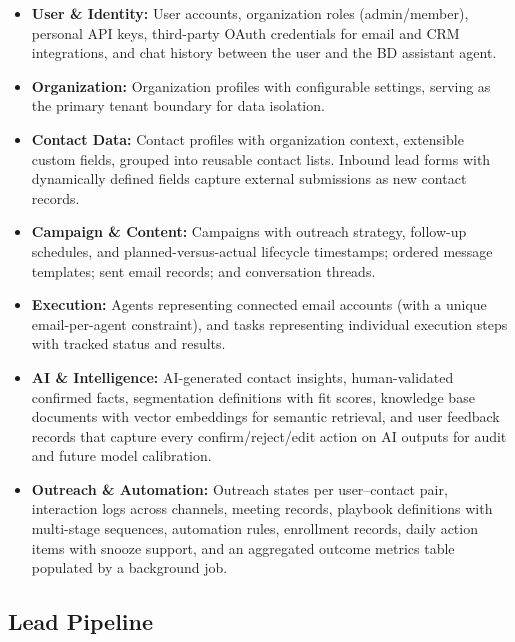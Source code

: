 \documentclass[a4paper]{article}
\begin{document}
\begin{itemize}
    \item \textbf{User \& Identity:} User accounts, organization
    roles (admin/member), personal API keys, third-party OAuth
    credentials for email and CRM integrations, and chat history
    between the user and the BD assistant agent.

    \item \textbf{Organization:} Organization profiles with
    configurable settings, serving as the primary tenant boundary
    for data isolation.

    \item \textbf{Contact Data:} Contact profiles with organization
    context, extensible custom fields, grouped into reusable contact
    lists. Inbound lead forms with dynamically defined fields
    capture external submissions as new contact records.

    \item \textbf{Campaign \& Content:} Campaigns with outreach
    strategy, follow-up schedules, and planned-versus-actual
    lifecycle timestamps; ordered message templates; sent email
    records; and conversation threads.

    \item \textbf{Execution:} Agents representing connected email
    accounts (with a unique email-per-agent constraint), and tasks
    representing individual execution steps with tracked status
    and results.

    \item \textbf{AI \& Intelligence:} AI-generated contact
    insights, human-validated confirmed facts, segmentation
    definitions with fit scores, knowledge base documents with
    vector embeddings for semantic retrieval, and user feedback
    records that capture every confirm/reject/edit action on AI
    outputs for audit and future model calibration.

    \item \textbf{Outreach \& Automation:} Outreach states per
    user--contact pair, interaction logs across channels, meeting
    records, playbook definitions with multi-stage sequences,
    automation rules, enrollment records, daily action items
    with snooze support, and an aggregated outcome metrics table
    populated by a background job.
\end{itemize}


\subsection{Lead Pipeline}
\end{document}
